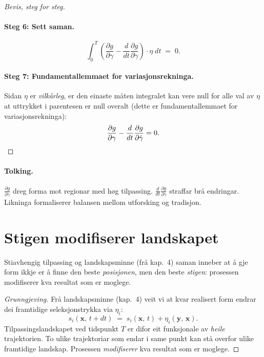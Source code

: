 \begin{proof}[Bevis, steg for steg]
\paragraph{Steg 6: Sett saman.}
\[
  \int_0^T \!\left(
    \frac{\partial g}{\partial \gamma}
    - \frac{d}{dt}\frac{\partial g}{\partial \dot{\gamma}}
  \right) \cdot \eta \; dt \;=\; 0.
\]

\paragraph{Steg 7: Fundamentallemmaet for variasjonsrekninga.}
Sidan $\eta$ er \emph{vilkårleg}, er den einaste måten integralet
kan vere null for alle val av $\eta$ at uttrykket i parentesen er
null overalt (dette er fundamentallemmaet for variasjonsrekninga):
\[
  \frac{\partial g}{\partial \gamma}
  - \frac{d}{dt}\frac{\partial g}{\partial \dot{\gamma}}
  = 0. \qedhere
\]
\end{proof}

\paragraph{Tolking.}
$\frac{\partial g}{\partial \gamma}$ dreg forma mot regionar med
høg tilpassing. $\frac{d}{dt}\frac{\partial g}{\partial
\dot{\gamma}}$ straffar brå endringar. Likninga formaliserer
balansen mellom utforsking og tradisjon.


\section{Stigen modifiserer landskapet}

\begin{satmark}\label{thm:L.8.3}
Stiavhengig tilpassing og landskapsminne (frå kap.~4) saman
inneber at å gje form ikkje er å finne den beste \emph{posisjonen},
men den beste \emph{stigen}: prosessen modifiserer kva resultat
som er moglege.
\end{satmark}

\begin{proof}[Grunngjeving]
Frå landskapsminne (kap.~4) veit vi at kvar realisert form
endrar dei framtidige seleksjonstrykka via $\eta_i$:
\[
  s_i(\bm{x},\, t + dt) \;=\;
  s_i(\bm{x},\, t) + \eta_i(\bm{y},\, \bm{x}).
\]
Tilpassingslandskapet ved tidspunkt $T$ er difor eit funksjonale
av \emph{heile} trajektorien.
To ulike trajektoriar som endar i same punkt kan stå overfor ulike
framtidige landskap. Prosessen \emph{modifiserer} kva resultat som
er moglege.
\end{proof}


